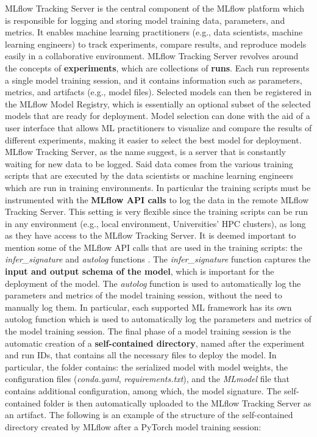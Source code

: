 MLflow Tracking Server is the central component of the MLflow platform which is responsible for logging and storing model training data, parameters, and metrics. 
It enables machine learning practitioners (e.g., data scientists, machine learning engineers) to track experiments, compare results, and reproduce models easily in a collaborative environment.
MLflow Tracking Server revolves around the concepts of \textbf{experiments}, which are collections of \textbf{runs}. 
Each run represents a single model training session, and it contains information such as parameters, metrics, and artifacts (e.g., model files).
Selected models can then be registered in the MLflow Model Registry, which is essentially an optional subset of the selected models that are ready for deployment.
Model selection can done with the aid of a user interface that allows ML practitioners to visualize and compare the results of different experiments, making it easier to select the best model for deployment.
MLflow Tracking Server, as the name suggest, is a server that is constantly waiting for new data to be logged. 
Said data comes from the various training scripts that are executed by the data scientists or machine learning engineers which are run in  training environments.
In particular the training scripts must be instrumented with the \textbf{MLflow API calls} to log the data in the remote MLflow Tracking Server.
This setting is very flexible since the training scripts can be run in any environment (e.g., local environment, Universities' HPC clusters), as long as they have access to the MLflow Tracking Server.
It is deemed important to mention some of the MLflow API calls that are used in the training scripts: the \textit{infer\_signature} and \textit{autolog} functions \cite{mlflow_docs}.
The \textit{infer\_signature} function captures the \textbf{input and output schema of the model}, which is important for the deployment of the model.
The \textit{autolog} function is used to automatically log the parameters and metrics of the model training session, without the need to manually log them. In particular, each supported ML framework has its own autolog function which is used to automatically log the parameters and metrics of the model training session.
The final phase of a model training session is the automatic creation of a \textbf{self-contained directory}, named after the experiment and run IDs, that contains all the necessary files to deploy the model. 
In particular, the folder contains: the serialized model with model weights, the configuration files (\textit{conda.yaml}, \textit{requirements.txt}), and the \textit{MLmodel} file that contains additional configuration, among which, the model signature.
The self-contained folder is then automatically uploaded to the MLflow Tracking Server as an artifact.
The following is an example of the structure of the self-contained directory created by MLflow after a PyTorch model training session: \\

